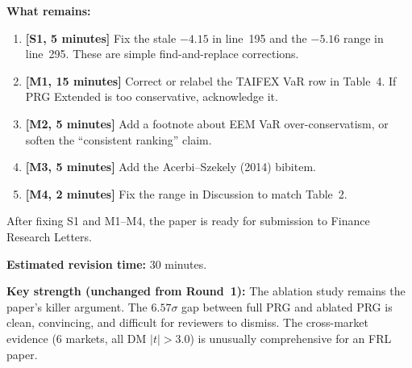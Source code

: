 \documentclass[12pt,a4paper]{article}
\begin{document}
\textbf{What remains:}
\begin{enumerate}
\item \textbf{[S1, 5 minutes]} Fix the stale $-4.15$ in line~195 and the $-5.16$ range in line~295. These are simple find-and-replace corrections.
\item \textbf{[M1, 15 minutes]} Correct or relabel the TAIFEX VaR row in Table~4. If PRG Extended is too conservative, acknowledge it.
\item \textbf{[M2, 5 minutes]} Add a footnote about EEM VaR over-conservatism, or soften the ``consistent ranking'' claim.
\item \textbf{[M3, 5 minutes]} Add the Acerbi--Szekely (2014) bibitem.
\item \textbf{[M4, 2 minutes]} Fix the range in Discussion to match Table~2.
\end{enumerate}

\noindent After fixing S1 and M1--M4, the paper is ready for submission to Finance Research Letters.

\textbf{Estimated revision time:} 30 minutes.

\textbf{Key strength (unchanged from Round~1):} The ablation study remains the paper's killer argument. The $6.57\sigma$ gap between full PRG and ablated PRG is clean, convincing, and difficult for reviewers to dismiss. The cross-market evidence (6 markets, all DM $|t| > 3.0$) is unusually comprehensive for an FRL paper.
\end{document}
